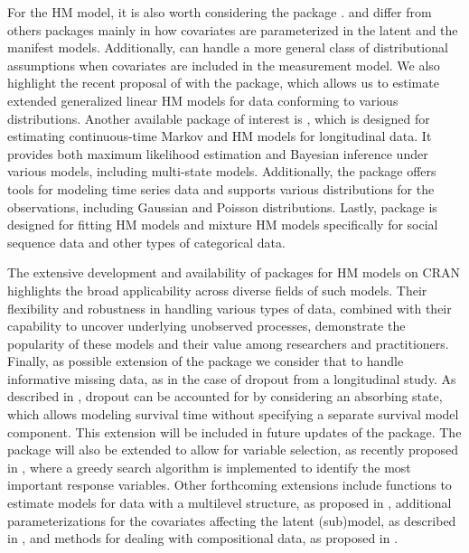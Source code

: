 For the HM model, it is also worth considering the 
package \citep{viss:spee:22}.  and
 differ from others packages mainly in how covariates
are parameterized in the latent and the manifest models. Additionally,
 can handle a more general class of distributional
assumptions when covariates are included in the measurement model. We
also highlight the recent proposal of \cite{turn:24} with the
 package, which allows us to estimate extended
generalized linear HM models for data conforming to various
distributions. Another available package of interest is 
\citep{jack:11}, which is designed for estimating continuous-time Markov
and HM models for longitudinal data. It provides both maximum likelihood
estimation and Bayesian inference under various models, including
multi-state models. Additionally, the  package
\citep{hart:21} offers tools for modeling time series data and supports
various distributions for the observations, including Gaussian and
Poisson distributions. Lastly, package 
\citep{hels:23} is designed for fitting HM models and mixture HM models
specifically for social sequence data and other types of categorical data.

The extensive development and availability of packages for HM models on
CRAN highlights the broad applicability across diverse fields of such
models. Their flexibility and robustness in handling various types of
data, combined with their capability to uncover underlying unobserved
processes, demonstrate the popularity of these models and their value
among researchers and practitioners. Finally, as possible extension of
the  package we consider that to handle informative
missing data, as in the case of dropout from a longitudinal study. As
described in \cite{pand:bart:penn:23}, dropout can be accounted for by
considering an absorbing state, which allows modeling survival time
without specifying a separate survival model component. This extension
will be included in future updates of the package. The package will also
be extended to allow for variable selection, as recently proposed in
\cite{penn:bart:pand:23}, where a greedy search algorithm is implemented
to identify the most important response variables. Other forthcoming
extensions include functions to estimate models for data with a
multilevel structure, as proposed in \cite{bart:penn:vitt:11},
additional parameterizations for the covariates affecting the latent
(sub)model, as described in \cite{bart:pand:penn:23a}, and methods for dealing with compositional data, as proposed in \cite{bart:etal:24}.

